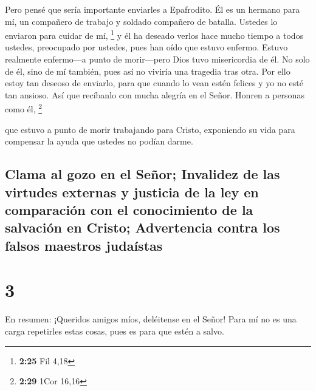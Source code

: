  Pero pensé que sería importante enviarles a Epafrodito.
Él es un hermano para mí, un compañero de trabajo y soldado compañero de
batalla. Ustedes lo enviaron para cuidar de mí, \footnote{\textbf{2:25}
  Fil 4,18}  y él ha deseado verlos hace mucho tiempo a
todos ustedes, preocupado por ustedes, pues han oído que estuvo enfermo.
 Estuvo realmente enfermo---a punto de morir---pero Dios
tuvo misericordia de él. No solo de él, sino de mí también, pues así no
viviría una tragedia tras otra.  Por ello estoy tan
deseoso de enviarlo, para que cuando lo vean estén felices y yo no esté
tan ansioso.  Así que recíbanlo con mucha alegría en el
Señor. Honren a personas como él, \footnote{\textbf{2:29} 1Cor 16,16}

 que estuvo a punto de morir trabajando para Cristo,
exponiendo su vida para compensar la ayuda que ustedes no podían darme.

\hypertarget{clama-al-gozo-en-el-seuxf1or-invalidez-de-las-virtudes-externas-y-justicia-de-la-ley-en-comparaciuxf3n-con-el-conocimiento-de-la-salvaciuxf3n-en-cristo-advertencia-contra-los-falsos-maestros-judauxedstas}{%
\subsection{Clama al gozo en el Señor; Invalidez de las virtudes
externas y justicia de la ley en comparación con el conocimiento de la
salvación en Cristo; Advertencia contra los falsos maestros
judaístas}\label{clama-al-gozo-en-el-seuxf1or-invalidez-de-las-virtudes-externas-y-justicia-de-la-ley-en-comparaciuxf3n-con-el-conocimiento-de-la-salvaciuxf3n-en-cristo-advertencia-contra-los-falsos-maestros-judauxedstas}}

\hypertarget{section-2}{%
\section{3}\label{section-2}}

 En resumen: ¡Queridos amigos míos, deléitense en el
Señor! Para mí no es una carga repetirles estas cosas, pues es para que
estén a salvo.

